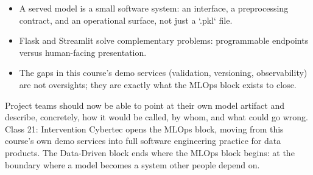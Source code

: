 \classclosingframe
{\begin{itemize}
\item A served model is a small software system: an interface, a preprocessing contract, and an operational surface, not just a `.pkl` file.
\item Flask and Streamlit solve complementary problems: programmable endpoints versus human-facing presentation.
\item The gaps in this course's demo services (validation, versioning, observability) are not oversights; they are exactly what the MLOps block exists to close.
\end{itemize}}
{Project teams should now be able to point at their own model artifact and describe, concretely, how it would be called, by whom, and what could go wrong.}
{Class 21: Intervention Cybertec opens the MLOps block, moving from this course's own demo services into full software engineering practice for data products.}
{The Data-Driven block ends where the MLOps block begins: at the boundary where a model becomes a system other people depend on.}


